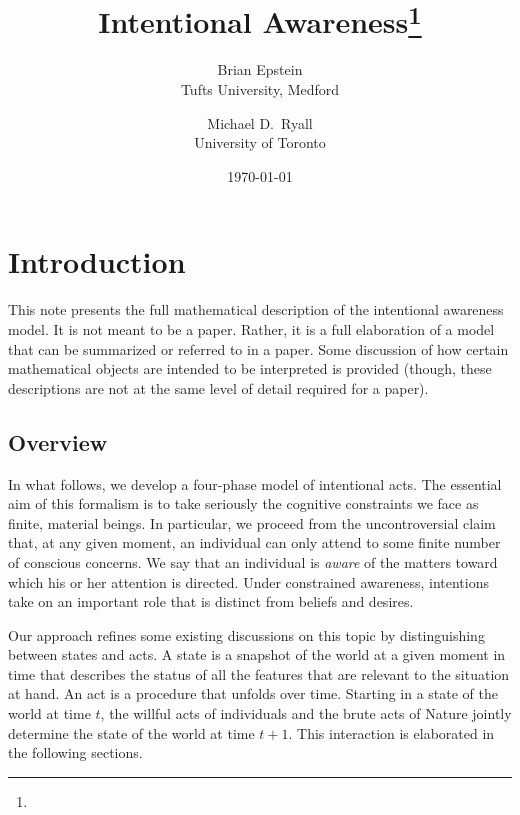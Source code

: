 \documentclass[
11pt,
titlepage,
reqno,
]{article}%
\theoremstyle{definition}
\begin{document}
	
	\title{Intentional Awareness\thanks{}
	}
	\author
	{
		Brian Epstein \\Tufts University, Medford
		\and 
		Michael D.\ Ryall \\University of Toronto 
	}
	\date{\today}
	\maketitle
	
	
	
	\def\baselinestretch{1.5}\small\normalsize
	\newcommand{\ra}[1]{\renewcommand{\arraystretch}{#1}}%
	\newpage
	
	
	
	\section{Introduction}\label{sec: intro}
	This note presents the full mathematical description of the intentional awareness model. 
	It is not meant to be a paper.
	Rather, it is a full elaboration of a model that can be summarized or referred to in a paper.
	Some discussion of how certain mathematical objects are intended to be interpreted is provided (though, these descriptions are not at the same level of detail required for a paper).
	
	\subsection{Overview}
	In what follows, we develop a four-phase model of intentional acts. 
	The essential aim of this formalism is to take seriously the cognitive constraints we face as finite, material beings.
	In particular, we proceed from the uncontroversial claim that, at any given moment, an individual can only  attend to some finite number of conscious concerns. 
	We say that an individual is \textit{aware} of the matters toward which his or her attention is directed.
	Under constrained awareness, intentions take on an important role that is distinct from beliefs and desires.
	
	Our approach refines some existing discussions on this topic by distinguishing between states and acts. 
	A state is a snapshot of the world at a given moment in time that describes the status of all the features that are relevant to the situation at hand. 
	An act is a procedure that unfolds over time. 
	Starting in a state of the world at time $t$, the willful acts of individuals and the brute acts of Nature jointly determine the state of the world at time $t+1$.
	This interaction is elaborated in the following sections.
	
\end{document}
